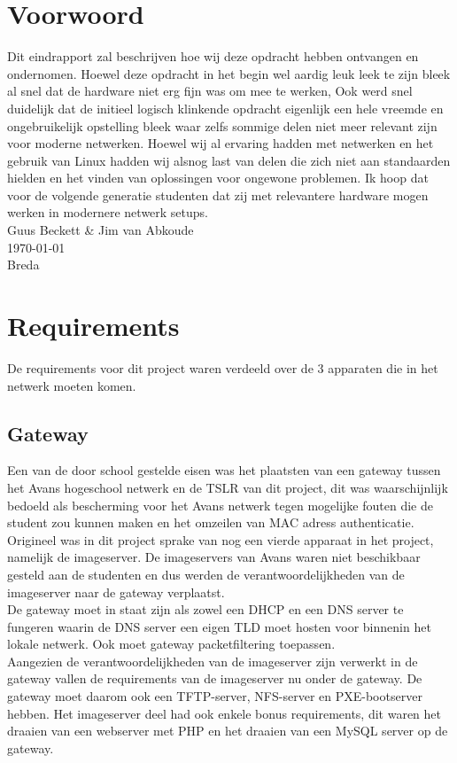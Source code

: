 \documentclass[12pt]{article}
\begin{document}
\clearpage
\section*{Voorwoord}
Dit eindrapport zal beschrijven hoe wij deze opdracht hebben ontvangen en ondernomen. Hoewel deze opdracht in het begin wel aardig leuk leek te zijn bleek al snel dat de hardware niet erg fijn was om mee te werken, Ook werd snel duidelijk dat de initieel logisch klinkende opdracht eigenlijk een hele vreemde en ongebruikelijk opstelling bleek waar zelfs sommige delen niet meer relevant zijn voor moderne netwerken. Hoewel wij al ervaring hadden met netwerken en het gebruik van Linux hadden wij alsnog last van delen die zich niet aan standaarden hielden en het vinden van oplossingen voor ongewone problemen. Ik hoop dat voor de volgende generatie studenten dat zij met relevantere hardware mogen werken in modernere netwerk setups.
\\
Guus Beckett \& Jim van Abkoude \\
\today \\
Breda
\newpage
\tableofcontents
\newpage
{}
\section{Requirements}
De requirements voor dit project waren verdeeld over de 3 apparaten die in het netwerk moeten komen.
\subsection{Gateway} %
\label{sub:gateway}
Een van de door school gestelde eisen was het plaatsten van een gateway tussen het Avans hogeschool netwerk en de TSLR van dit project, dit was waarschijnlijk bedoeld als bescherming voor het Avans netwerk tegen mogelijke fouten die de student zou kunnen maken en het omzeilen van MAC adress authenticatie. Origineel was in dit project sprake van nog een vierde apparaat in het project, namelijk de imageserver. De imageservers van Avans waren niet beschikbaar gesteld aan de studenten en dus werden de verantwoordelijkheden van de imageserver naar de gateway verplaatst.
\\De gateway moet in staat zijn als zowel een DHCP en een DNS server te fungeren waarin de DNS server een eigen TLD moet hosten voor binnenin het lokale netwerk. Ook moet gateway packetfiltering toepassen.
\\Aangezien de verantwoordelijkheden van de imageserver zijn verwerkt in de gateway vallen de requirements van de imageserver nu onder de gateway. De gateway moet daarom ook een TFTP-server, NFS-server en PXE-bootserver hebben. Het imageserver deel had ook enkele bonus requirements, dit waren het draaien van een webserver met PHP en het draaien van een MySQL server op de gateway.
\end{document}
